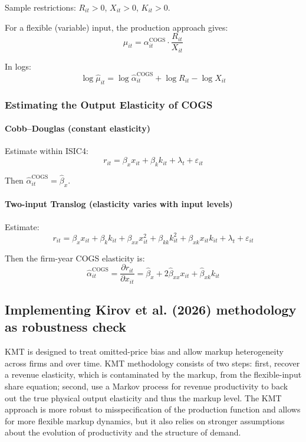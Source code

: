 \documentclass[12pt]{article}
\begin{document}
Sample restrictions: $R_{it} > 0$, $X_{it} > 0$, $K_{it} > 0$.

For a flexible (variable) input, the production approach gives:
\[
\mu_{it} = \alpha_{it}^{\text{COGS}} \cdot \frac{R_{it}}{X_{it}}
\]

In logs:
\[
\log \hat{\mu}_{it} = \log \hat{\alpha}_{it}^{\text{COGS}} + \log R_{it} - \log X_{it}
\]

\subsubsection{Estimating the Output Elasticity of COGS}

\paragraph{Cobb--Douglas (constant elasticity)}

Estimate within ISIC4:
\[
r_{it} = \beta_x x_{it} + \beta_k k_{it} + \lambda_t + \varepsilon_{it}
\]

Then $\hat{\alpha}_{it}^{\text{COGS}} = \hat{\beta}_x$.

\paragraph{Two-input Translog (elasticity varies with input levels)}

Estimate:
\[
r_{it} = \beta_x x_{it} + \beta_k k_{it} + \beta_{xx} x_{it}^2 + \beta_{kk} k_{it}^2 + \beta_{xk} x_{it} k_{it} + \lambda_t + \varepsilon_{it}
\]

Then the firm-year COGS elasticity is:
\[
\hat{\alpha}_{it}^{\text{COGS}} = \frac{\partial r_{it}}{\partial x_{it}} = \hat{\beta}_x + 2\hat{\beta}_{xx} x_{it} + \hat{\beta}_{xk} k_{it}
\]

\subsection{Implementing Kirov et al. (2026) methodology as robustness check}

KMT is designed to treat omitted-price bias and allow markup heterogeneity across firms and over time. KMT methodology consists of two steps: first, recover a revenue elasticity, which is contaminated by the markup, from the flexible-input share equation; second, use a Markov process for revenue productivity to back out the true physical output elasticity and thus the markup level. The KMT approach is more robust to misspecification of the production function and allows for more flexible markup dynamics, but it also relies on stronger assumptions about the evolution of productivity and the structure of demand.
\end{document}

